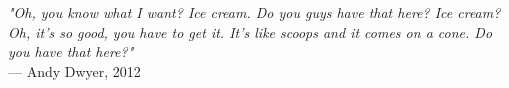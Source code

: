 \begin{flushright}
\emph{"Oh, you know what I want? Ice cream. Do you guys have that here? Ice cream? Oh, it’s so good, you have to get it. It’s like scoops and it comes on a cone. Do you have that here?"}\\
--- Andy Dwyer, 2012
\end{flushright}
